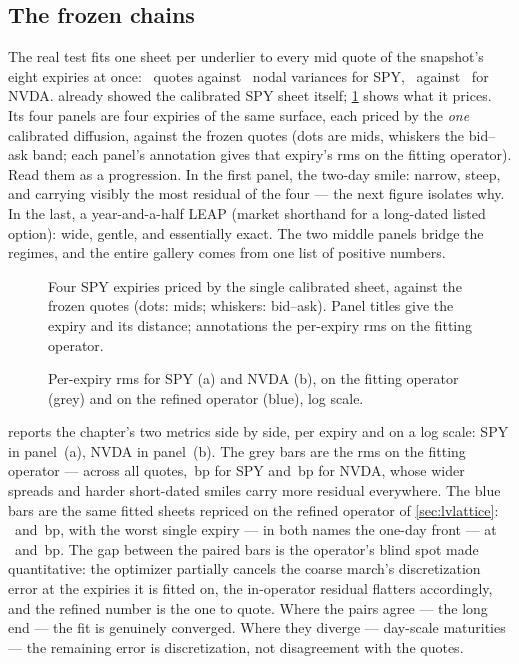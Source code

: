 \subsection{The frozen chains}

The real test fits one sheet per underlier to every mid quote
of the snapshot's eight expiries at once: \MacLvSpyQuotes\ quotes
against \MacLvSpyVtx\ nodal variances for SPY, \MacLvNvdaQuotes\
against \MacLvNvdaVtx\ for NVDA.   already showed
the calibrated SPY sheet itself; \cref{fig:lvfit} shows what it
prices.  Its four panels are four expiries of the same surface,
each priced by the \emph{one} calibrated diffusion, against the frozen
quotes (dots are mids, whiskers the bid--ask band; each panel's
annotation gives that expiry's rms on the fitting operator).  Read
them as a progression.  In the first panel, the two-day smile: narrow,
steep, and carrying visibly the most residual of the four --- the next
figure isolates why.  In the last, a year-and-a-half LEAP (market
shorthand for a long-dated listed option): wide, gentle, and
essentially exact.  The two middle panels bridge the regimes, and the
entire gallery comes from
one list of positive numbers.

\begin{figure}[htbp]
\centering
{}
\caption{Four SPY expiries priced by the single calibrated sheet,
against the frozen quotes (dots: mids; whiskers: bid--ask).  Panel
titles give the expiry and its distance; annotations the per-expiry
rms on the fitting operator.}
\label{fig:lvfit}
\end{figure}

\begin{figure}[htbp]
\centering
{}
\caption{Per-expiry rms for SPY (a) and NVDA (b), on the fitting
operator (grey) and on the refined operator (blue), log scale.}
\label{fig:lvrms}
\end{figure}

 reports the chapter's two metrics side by side, per
expiry and on a log scale: SPY in panel~(a), NVDA in panel~(b).  The
grey bars are the rms on the fitting operator --- across all quotes,
\MacLvSpyRmsBp\,bp for SPY and \MacLvNvdaRmsBp\,bp for NVDA, whose
wider spreads and harder short-dated smiles carry more residual
everywhere.  The blue bars are the same fitted sheets repriced on the
refined operator of \cref{sec:lvlattice}: \MacLvSpyConvBp\ and
\MacLvNvdaConvBp\,bp, with the worst single expiry --- in both names
the one-day front --- at \MacLvSpyWorstConvBp\ and
\MacLvNvdaWorstConvBp\,bp.  The gap between the paired bars is the
operator's blind spot made quantitative: the optimizer partially
cancels the coarse march's discretization error at the expiries it is
fitted on, the in-operator residual flatters accordingly, and the
refined number is the one to quote.  Where the pairs agree --- the
long end --- the fit is genuinely converged.  Where they diverge ---
day-scale maturities --- the remaining error is discretization, not
disagreement with the quotes.

